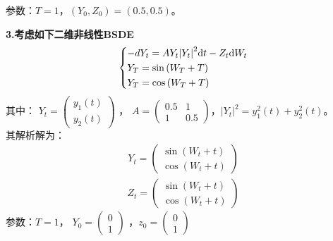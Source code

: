 	参数：$T=1$，$(Y_0,Z_0)=(0.5,0.5)$。\par
	\textbf{3.考虑如下二维非线性BSDE}
			\begin{equation*}
			\centering
			\left\{\begin{lgathered}
			{ - d{Y_t} = A{Y_t}{{\left| {{Y_t}} \right|}^2}\mathrm{d}t - {Z_t}\mathrm{d}{W_t}}\\
			{{Y_T} = \sin \left( {{W_T} + T} \right)}\\
			{{Y_T} = \cos \left( {{W_T} + T} \right)}
			\end{lgathered} \right.
			\end{equation*}
	其中：
	\begin{math}
		{Y_t} = \left( \begin{smallmatrix}
		{y_1}\left( t \right)\\
		{y_2}\left( t \right)
		\end{smallmatrix} \right)
	\end{math} ，
	\begin{math}
		A = \left(
		\begin{smallmatrix}
		0.5&1\\
		1&0.5
		\end{smallmatrix}
		\right)
	\end{math}，${\left| {{Y_t}} \right|^2} = y_1^2\left( t \right) + y_2^2\left( t \right)$。\\
	其解析解为：
	\begin{align*}
	{{Y_t} = \left( {\begin{array}{*{20}{c}}
	{\sin \left( {{W_t} + t} \right)}\\
	{\cos \left( {{W_t} + t} \right)}
	\end{array}} \right)}\end{align*}
	\begin{align*}
	{Z_t} = \left( {\begin{array}{*{20}{c}}
	{\sin \left( {{W_t} + t} \right)}\\
	{\cos \left( {{W_t} + t} \right)}
	\end{array}} \right)\end{align*}
	参数：$T=1$， \begin{math}Y_0 = \left( \begin{smallmatrix}
	0\\1
	\end{smallmatrix} \right)\end{math}
	，\begin{math}z_0 = \left( \begin{smallmatrix}
	0\\1
	\end{smallmatrix} \right)\end{math}
